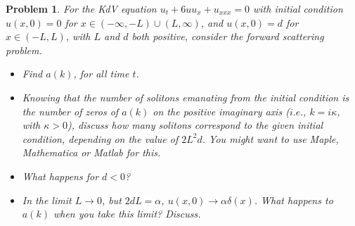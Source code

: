 \documentclass[12pt]{report}
\newtheorem{problem}{Problem}
\begin{document}
\newpage



\begin{problem}
    For the KdV equation $u_t+6uu_x+u_{xxx}=0$ with initial condition
$u(x,0)=0$ for $x\in (-\infty,-L)\cup(L,\infty)$, and $u(x,0)=d$ for
$x\in(-L,L)$, with $L$ and $d$ both positive,
consider the forward scattering problem.
\begin{itemize}
\item Find $a(k)$, for all time $t$.
\item Knowing that the number of solitons emanating from the initial condition
is the number of zeros of $a(k)$ on the positive imaginary axis ($i.e.$,
$k=i\kappa$, with $\kappa>0$), discuss how
many solitons correspond to the given initial condition, depending on the value
of $2L^2d$.  You might want to use Maple, Mathematica or Matlab for this.
\item What happens for $d<0$?
\item In the limit $L\rightarrow 0$, but $2dL=\alpha$, $u(x,0)\rightarrow \alpha
\delta(x)$. What happens to $a(k)$ when you take this limit? Discuss.
\end{itemize}
\end{problem}
\end{document}
